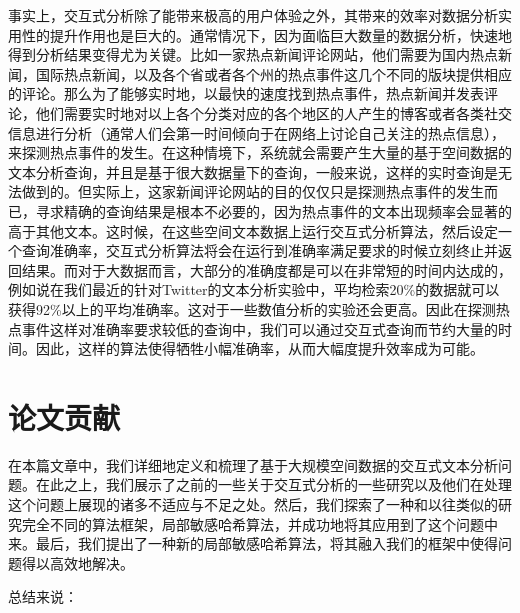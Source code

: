 事实上，交互式分析除了能带来极高的用户体验之外，其带来的效率对数据分析实用性的提升作用也是巨大的。通常情况下，因为面临巨大数量的数据分析，快速地得到分析结果变得尤为关键。比如一家热点新闻评论网站，他们需要为国内热点新闻，国际热点新闻，以及各个省或者各个州的热点事件这几个不同的版块提供相应的评论。那么为了能够实时地，以最快的速度找到热点事件，热点新闻并发表评论，他们需要实时地对以上各个分类对应的各个地区的人产生的博客或者各类社交信息进行分析（通常人们会第一时间倾向于在网络上讨论自己关注的热点信息），来探测热点事件的发生。在这种情境下，系统就会需要产生大量的基于空间数据的文本分析查询，并且是基于很大数据量下的查询，一般来说，这样的实时查询是无法做到的。但实际上，这家新闻评论网站的目的仅仅只是探测热点事件的发生而已，寻求精确的查询结果是根本不必要的，因为热点事件的文本出现频率会显著的高于其他文本。这时候，在这些空间文本数据上运行交互式分析算法，然后设定一个查询准确率，交互式分析算法将会在运行到准确率满足要求的时候立刻终止并返回结果。而对于大数据而言，大部分的准确度都是可以在非常短的时间内达成的，例如说在我们最近的针对Twitter的文本分析实验中，平均检索20\%的数据就可以获得92\%以上的平均准确率。这对于一些数值分析的实验还会更高。因此在探测热点事件这样对准确率要求较低的查询中，我们可以通过交互式查询而节约大量的时间。因此，这样的算法使得牺牲小幅准确率，从而大幅度提升效率成为可能。

\section{论文贡献}

在本篇文章中，我们详细地定义和梳理了基于大规模空间数据的交互式文本分析问题。在此之上，我们展示了之前的一些关于交互式分析的一些研究以及他们在处理这个问题上展现的诸多不适应与不足之处。然后，我们探索了一种和以往类似的研究完全不同的算法框架，局部敏感哈希算法，并成功地将其应用到了这个问题中来。最后，我们提出了一种新的局部敏感哈希算法，将其融入我们的框架中使得问题得以高效地解决。

总结来说：


